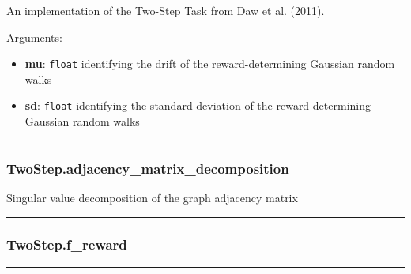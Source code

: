An implementation of the Two-Step Task from Daw et al. (2011).

Arguments:

\begin{itemize}
\tightlist
\item
  \textbf{mu}: \texttt{float} identifying the drift of the
  reward-determining Gaussian random walks
\item
  \textbf{sd}: \texttt{float} identifying the standard deviation of the
  reward-determining Gaussian random walks
\end{itemize}

\begin{center}\rule{0.5\linewidth}{\linethickness}\end{center}

\hypertarget{twostep.adjacency_matrix_decomposition}{%
\subsubsection{TwoStep.adjacency\_matrix\_decomposition}\label{twostep.adjacency_matrix_decomposition}}

\begin{Shaded}
\begin{Highlighting}[]
\NormalTok{)}
\end{Highlighting}
\end{Shaded}

Singular value decomposition of the graph adjacency matrix

\begin{center}\rule{0.5\linewidth}{\linethickness}\end{center}

\hypertarget{twostep.f_reward}{%
\subsubsection{TwoStep.f\_reward}\label{twostep.f_reward}}

\begin{Shaded}
\begin{Highlighting}[]
\end{Highlighting}
\end{Shaded}

\begin{center}\rule{0.5\linewidth}{\linethickness}\end{center}

